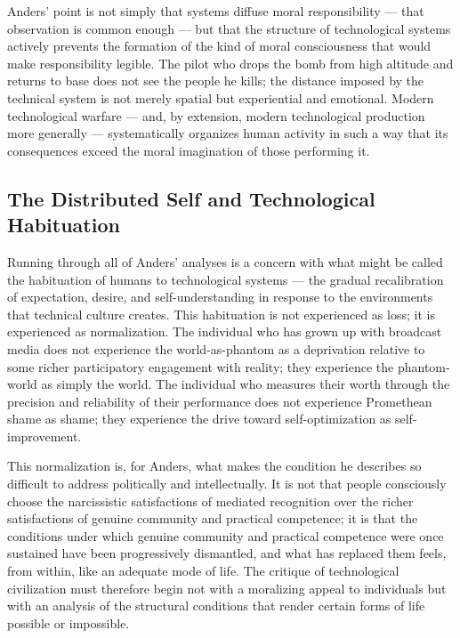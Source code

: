 \documentclass[12pt]{memoir}
\begin{document}
Anders' point is not simply that systems diffuse moral responsibility — that observation is
common enough — but that the structure of technological systems actively prevents the formation
of the kind of moral consciousness that would make responsibility legible. The pilot who drops
the bomb from high altitude and returns to base does not see the people he kills; the distance
imposed by the technical system is not merely spatial but experiential and emotional. Modern
technological warfare — and, by extension, modern technological production more generally —
systematically organizes human activity in such a way that its consequences exceed the moral
imagination of those performing it.

\subsection{The Distributed Self and Technological Habituation}

Running through all of Anders' analyses is a concern with what might be called the habituation
of humans to technological systems — the gradual recalibration of expectation, desire, and
self-understanding in response to the environments that technical culture creates. This
habituation is not experienced as loss; it is experienced as normalization. The individual who
has grown up with broadcast media does not experience the world-as-phantom as a deprivation
relative to some richer participatory engagement with reality; they experience the
phantom-world as simply the world. The individual who measures their worth through the
precision and reliability of their performance does not experience Promethean shame as shame;
they experience the drive toward self-optimization as self-improvement.

This normalization is, for Anders, what makes the condition he describes so difficult to address
politically and intellectually. It is not that people consciously choose the narcissistic
satisfactions of mediated recognition over the richer satisfactions of genuine community and
practical competence; it is that the conditions under which genuine community and practical
competence were once sustained have been progressively dismantled, and what has replaced them
feels, from within, like an adequate mode of life. The critique of technological civilization
must therefore begin not with a moralizing appeal to individuals but with an analysis of the
structural conditions that render certain forms of life possible or impossible.
\end{document}
